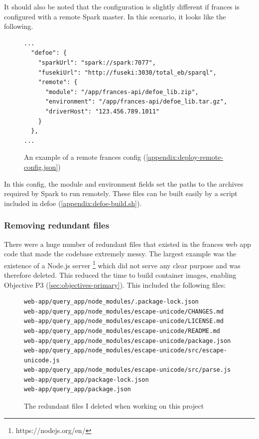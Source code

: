 \documentclass[12pt, letterpaper]{article}
\begin{document}
\begin{flushleft}
It should also be noted that the configuration is slightly different if frances is configured with a remote Spark master. In this scenario, it looks like the following.
\end{flushleft}

\begin{flushleft}
\begin{figure}[H]
\begin{verbatim}
...
  "defoe": {
    "sparkUrl": "spark://spark:7077",
    "fusekiUrl": "http://fuseki:3030/total_eb/sparql",
    "remote": {
      "module": "/app/frances-api/defoe_lib.zip",
      "environment": "/app/frances-api/defoe_lib.tar.gz",
      "driverHost": "123.456.789.1011"
    }
  },
...
\end{verbatim}
\caption{An example of a remote frances config (\ref{appendix:deploy-remote-config.json})}
\end{figure}
\end{flushleft}

\begin{flushleft}
In this config, the module and environment fields set the paths to the archives required by Spark to run remotely. These files can be built easily by a script included in defoe (\ref{appendix:defoe-build.sh}).
\end{flushleft}

\subsubsection{Removing redundant files}\label{sec:impl-backend-redundant}

\begin{flushleft}
There were a huge number of redundant files that existed in the frances web app code that made the codebase extremely messy. The largest example was the existence of a Node.js server \footnote{https://nodejs.org/en/} which did not serve any clear purpose and was therefore deleted. This reduced the time to build container images, enabling Objective P3 (\ref{sec:objectives-primary}). This included the following files:
\end{flushleft}

\begin{flushleft}
\begin{figure}[H]
\begin{verbatim}
web-app/query_app/node_modules/.package-lock.json
web-app/query_app/node_modules/escape-unicode/CHANGES.md
web-app/query_app/node_modules/escape-unicode/LICENSE.md
web-app/query_app/node_modules/escape-unicode/README.md
web-app/query_app/node_modules/escape-unicode/package.json
web-app/query_app/node_modules/escape-unicode/src/escape-unicode.js
web-app/query_app/node_modules/escape-unicode/src/parse.js
web-app/query_app/package-lock.json
web-app/query_app/package.json
\end{verbatim}
\caption{The redundant files I deleted when working on this project}
\end{figure}
\end{flushleft}
\end{document}
